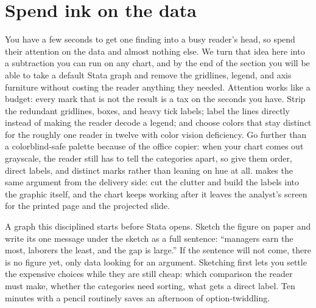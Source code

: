 \documentclass[
    a4paper,
    fontsize=10pt,
    twoside=true,
    numbers=noenddot,
]{kaobook}
\begin{document}
\section{Spend ink on the data}
You have a few seconds to get one finding into a busy reader's head, so spend their attention on the data and almost nothing else. We turn that idea here into a subtraction you can run on any chart, and by the end of the section you will be able to take a default Stata graph and remove the gridlines, legend, and axis furniture without costing the reader anything they needed. Attention works like a budget: every mark that is not the result is a tax on the seconds you have. Strip the redundant gridlines, boxes, and heavy tick labels; label the lines directly instead of making the reader decode a legend; and choose colors that stay distinct for the roughly one reader in twelve with color vision deficiency. Go further than a colorblind-safe palette because of the office copier: when your chart comes out grayscale, the reader still has to tell the categories apart, so give them order, direct labels, and distinct marks rather than leaning on hue at all. \textcite{schwabish2014economist} makes the same argument from the delivery side: cut the clutter and build the labels into the graphic itself, and the chart keeps working after it leaves the analyst's screen for the printed page and the projected slide.

A graph this disciplined starts before Stata opens. Sketch the figure on paper and write its one message under the sketch as a full sentence: \enquote{managers earn the most, laborers the least, and the gap is large.} If the sentence will not come, there is no figure yet, only data looking for an argument. Sketching first lets you settle the expensive choices while they are still cheap: which comparison the reader must make, whether the categories need sorting, what gets a direct label. Ten minutes with a pencil routinely saves an afternoon of option-twiddling.
\end{document}
